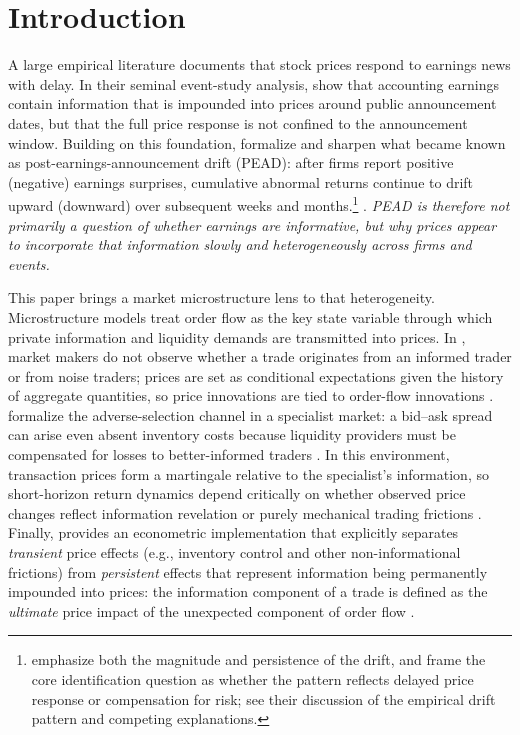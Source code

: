 
\section{Introduction}
A large empirical literature documents that stock prices respond to earnings news with delay.
In their seminal event-study analysis, \citet{BallBrown1968} show that accounting earnings contain
information that is impounded into prices around public announcement dates, but that the full
price response is not confined to the announcement window.
Building on this foundation, \citet{BernardThomas1989} formalize and sharpen what became known
as post-earnings-announcement drift (PEAD): after firms report positive (negative) earnings
surprises, cumulative abnormal returns continue to drift upward (downward) over subsequent weeks
and months.\footnote{\citet{BernardThomas1989} emphasize both the magnitude and persistence of the
drift, and frame the core identification question as whether the pattern reflects delayed price response
or compensation for risk; see their discussion of the empirical drift pattern and competing explanations.} %
\citep{BernardThomas1989}. \textit{PEAD is therefore not primarily a question of whether earnings
are informative, but why prices appear to incorporate that information slowly and heterogeneously
across firms and events.}

This paper brings a market microstructure lens to that heterogeneity. Microstructure models treat
order flow as the key state variable through which private information and liquidity demands are
transmitted into prices. In \citet{Kyle1985}, market makers do not observe whether a trade originates
from an informed trader or from noise traders; prices are set as conditional expectations given the
history of aggregate quantities, so price innovations are tied to order-flow innovations \citep{Kyle1985}. %
\citet{GlostenMilgrom1985} formalize the adverse-selection channel in a specialist market:
a bid--ask spread can arise even absent inventory costs because liquidity providers must be compensated
for losses to better-informed traders \citep{GlostenMilgrom1985}. In this environment, transaction prices
form a martingale relative to the specialist's information, so short-horizon return dynamics depend
critically on whether observed price changes reflect information revelation or purely mechanical trading frictions
\citep{GlostenMilgrom1985}. %
Finally, \citet{Hasbrouck1991} provides an econometric implementation that explicitly separates
\emph{transient} price effects (e.g., inventory control and other non-informational frictions) from
\emph{persistent} effects that represent information being permanently impounded into prices:
the information component of a trade is defined as the \emph{ultimate} price impact of the unexpected
component of order flow \citep{Hasbrouck1991}.

